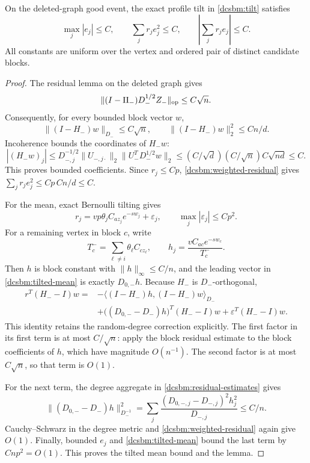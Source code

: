 \begin{lemma}
\label{dcsbm:weighted-cancellation}
On the deleted-graph good event, the exact profile tilt in
\cref{dcsbm:tilt} satisfies
\begin{equation}
 \max_j|e_j|\le C,\qquad
 \sum_jr_je_j^2\le C,\qquad
 \left|\sum_jr_je_j\right|\le C.
 \label{dcsbm:three-moments}
\end{equation}
All constants are uniform over the vertex and ordered pair of
distinct candidate blocks.
\end{lemma}

\begin{proof}
The residual lemma on the deleted graph gives
\[
 \|(I-\Pi_-)D_-^{1/2}Z_-\|_{\mathrm{op}}\le C\sqrt n.
\]
Consequently, for every bounded block vector \(w\),
\begin{equation}
 \|(I-H_-)w\|_{D_-}\le C\sqrt n,\qquad
 \|(I-H_-)w\|_2^2\le Cn/d.
 \label{dcsbm:weighted-residual}
\end{equation}
Incoherence bounds the coordinates of \(H_-w\):
\[
 |(H_-w)_j|
 \le D_{-,j}^{-1/2}\|U_{-,j\cdot}\|_2
          \|U_-^TD_-^{1/2}w\|_2
 \le (C/\sqrt d)(C/\sqrt n)C\sqrt{nd}\le C.
\]
This proves bounded coefficients.  Since \(r_j\le Cp\),
\cref{dcsbm:weighted-residual} gives
\(\sum_jr_je_j^2\le Cp\,Cn/d\le C\).

For the mean, exact Bernoulli tilting gives
\begin{equation}
 r_j=vp\theta_j C_{az_j}e^{-sw_j}+\varepsilon_j,
 \qquad \max_j|\varepsilon_j|\le Cp^2.
 \label{dcsbm:tilted-mean}
\end{equation}
For a remaining vertex in block \(c\), write
\[
 T_c^-=\sum_{\ell\ne i}\theta_\ell C_{cz_\ell},\qquad
 h_j=\frac{v C_{ac}e^{-sw_c}}{T_c^-}.
\]
Then \(h\) is block constant with \(\|h\|_\infty\le C/n\), and
the leading vector in \cref{dcsbm:tilted-mean} is exactly
\(D_{0,-}h\).  Because \(H_-\) is \(D_-\)-orthogonal,
\begin{align}
 r^T(H_--I)w
 ={}&-\langle(I-H_-)h,(I-H_-)w\rangle_{D_-}
       \nonumber\\
 &+\big((D_{0,-}-D_-)h\big)^T(H_--I)w
   +\varepsilon^T(H_--I)w .
 \label{dcsbm:weighted-identity}
\end{align}
This identity retains the random-degree correction explicitly.
The first factor in its first term is at most \(C/\sqrt n\):
apply the block residual estimate to the block coefficients of
\(h\), which have magnitude \(O(n^{-1})\).
The second factor is at most \(C\sqrt n\), so that term is \(O(1)\).

For the next term, the degree aggregate in
\cref{dcsbm:residual-estimates} gives
\[
 \|(D_{0,-}-D_-)h\|_{D_-^{-1}}^2
 =\sum_j\frac{(D_{0,-,j}-D_{-,j})^2h_j^2}{D_{-,j}}
 \le C/n.
\]
Cauchy--Schwarz in the degree metric and
\cref{dcsbm:weighted-residual} again give \(O(1)\).
Finally, bounded \(e_j\) and
\cref{dcsbm:tilted-mean} bound the last term by
\(Cnp^2=O(1)\).  This proves the tilted mean bound and the lemma.
\end{proof}

